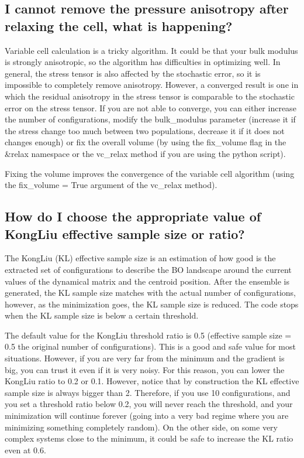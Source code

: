 \documentclass[a4paper,11pt,english]{sphinxmanual}
\begin{document}
\subsection{I cannot remove the pressure anisotropy after relaxing the cell, what is happening?}
\label{\detokenize{faq:i-cannot-remove-the-pressure-anisotropy-after-relaxing-the-cell-what-is-happening}}
\sphinxAtStartPar
Variable cell calculation is a tricky algorithm. It could be that your bulk modulus is strongly anisotropic, so the algorithm has difficulties in optimizing well.
In general, the stress tensor is also affected by the stochastic error, so it is impossible to completely remove anisotropy. However, a converged result is one in which the residual anisotropy in the stress tensor is comparable to the stochastic error on the stress tensor.
If you are not able to converge, you can either increase the number of configurations, modify the bulk\_modulus parameter (increase it if the stress change too much between two populations, decrease it if it does not changes enough) or fix the overall volume (by using the fix\_volume flag in the \&relax namespace or the vc\_relax method if you are using the python script).

\sphinxAtStartPar
Fixing the volume improves the convergence of the variable cell algorithm (using the fix\_volume = True argument of the vc\_relax method).


\subsection{How do I choose the appropriate value of Kong\sphinxhyphen{}Liu effective sample size or ratio?}
\label{\detokenize{faq:how-do-i-choose-the-appropriate-value-of-kong-liu-effective-sample-size-or-ratio}}
\sphinxAtStartPar
The Kong\sphinxhyphen{}Liu (KL) effective sample size is an estimation of how good is the extracted set of configurations to describe the BO landscape around the current values of the dynamical matrix and the centroid position. After the ensemble is generated, the KL sample size matches with the actual number of configurations, however, as the minimization goes, the KL sample size is reduced. The code stops when the KL sample size is below a certain threshold.

\sphinxAtStartPar
The default value for the Kong\sphinxhyphen{}Liu threshold ratio is 0.5 (effective sample size = 0.5 the original number of configurations). This is a good and safe value for most situations. However, if you are very far from the minimum and the gradient is big, you can trust it even if it is very noisy. For this reason, you can lower the Kong\sphinxhyphen{}Liu ratio to 0.2 or 0.1. However, notice that by construction the KL effective sample size is always bigger than 2.  Therefore, if you use 10 configurations, and you set a threshold ratio below 0.2, you will never reach the threshold, and your minimization will continue forever (going into a very bad regime where you are minimizing something completely random). On the other side, on some very complex systems close to the minimum, it could be safe to increase the KL ratio even at 0.6.
\end{document}
